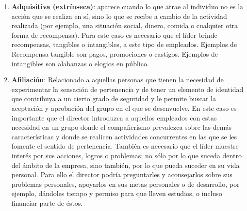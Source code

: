 \begin{enumerate}
\item \textbf{Adquisitiva (extrínseca)}: aparece cuando lo que atrae al individuo no es la acción que se realiza en sí, sino lo que se recibe a cambio de la actividad realizada (por ejemplo, una situación social, dinero, comida o cualquier otra forma de recompensa).
Para este caso es necesario que el líder brinde recompensas, tangibles o intangibles, a este tipo de empleados. Ejemplos de Recompensa tangible son pagos, promociones o castigos. Ejemplos de intangibles son alabanzas o elogios en público.

\item \textbf{Afiliación}: Relacionado a aquellas personas que tienen la necesidad de experimentar la sensación de pertenencia y de tener un elemento de identidad que contribuya a un cierto grado de seguridad y le permite buscar la aceptación y aprobación del grupo en el que se desenvuelve. 
En este caso es importante que el director introduzca a aquellos empleados con estas necesidad en un grupo donde el compañerismo prevalezca sobre las demás  características y donde se realicen actividades concurrentes en las que se les fomente el sentido de pertenencia.
También es necesario que el líder muestre interés por sus acciones, logros o problemas; no sólo por lo que suceda dentro del ámbito de la empresa, sino también, por lo que pueda suceder en su vida personal.
Para ello el director podría preguntarles y aconsejarlos sobre sus problemas personales, apoyarlos en sus metas personales o de desarrollo, por ejemplo, dándoles tiempo y permiso para que lleven estudios, o incluso financiar parte de éstos.
\end{enumerate}
